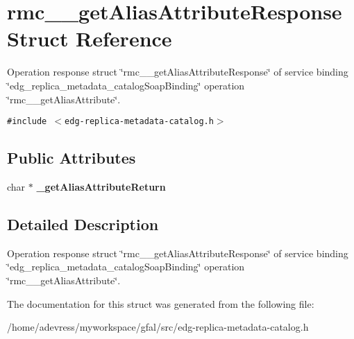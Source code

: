 \section{rmc\_\-\_\-get\-Alias\-Attribute\-Response Struct Reference}
\label{structrmc____getAliasAttributeResponse}
Operation response struct \char`\"{}rmc\_\-\_\-get\-Alias\-Attribute\-Response\char`\"{} of service binding \char`\"{}edg\_\-replica\_\-metadata\_\-catalog\-Soap\-Binding\char`\"{} operation \char`\"{}rmc\_\-\_\-get\-Alias\-Attribute\char`\"{}.  


{\tt \#include $<$edg-replica-metadata-catalog.h$>$}

\subsection*{Public Attributes}
\begin{CompactItemize}
\item 
char $\ast$ \textbf{\_\-get\-Alias\-Attribute\-Return}\label{structrmc____getAliasAttributeResponse_68915585e53b9c54c994ea0d29010e6e}

\end{CompactItemize}


\subsection{Detailed Description}
Operation response struct \char`\"{}rmc\_\-\_\-get\-Alias\-Attribute\-Response\char`\"{} of service binding \char`\"{}edg\_\-replica\_\-metadata\_\-catalog\-Soap\-Binding\char`\"{} operation \char`\"{}rmc\_\-\_\-get\-Alias\-Attribute\char`\"{}. 



The documentation for this struct was generated from the following file:\begin{CompactItemize}
\item 
/home/adevress/myworkspace/gfal/src/edg-replica-metadata-catalog.h\end{CompactItemize}
